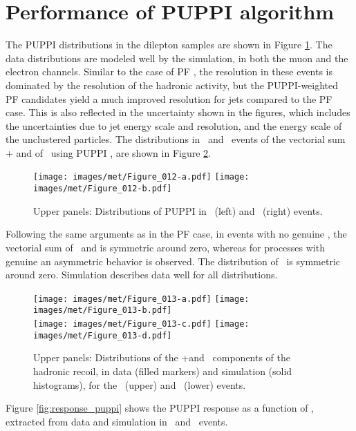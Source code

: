 \section{Performance of PUPPI \ptmiss algorithm}
\noindent\justify
The PUPPI \ptmiss distributions in the dilepton samples are shown in Figure \ref{fig:puppimet}. 
The data distributions are modeled well by the simulation, in both the muon and the electron channels. 
Similar to the case of PF \ptmiss, the \ptmiss resolution in these events is dominated by the resolution of the hadronic activity, 
but the PUPPI-weighted PF candidates yield a much improved resolution for jets compared to the PF case. 
This is also reflected in the uncertainty shown in the figures, which includes the uncertainties due to jet energy scale and resolution, and the energy scale of the unclustered particles. 
The distributions in \Zmm\ and \Zee\ events of the vectorial sum \upar + \qt and of \uperp\, using PUPPI \ptmiss, are shown in Figure \ref{fig:uparuperp_puppi}. 
\begin{figure}[htbp!]
  \centering
  \texttt{[image: images/met/Figure\_012-a.pdf]}
  \texttt{[image: images/met/Figure\_012-b.pdf]}
  \caption{Upper panels: Distributions of PUPPI \ptmiss in \Zmm\ (left) and \Zee\ (right) events.}
  \label{fig:puppimet}
\end{figure}
\newpara
\noindent\justify
Following the same arguments as in the PF \ptmiss case, in events with no genuine \ptmiss, the vectorial sum of \upar\ and \qt is symmetric around zero, whereas for processes with genuine \ptmiss an asymmetric behavior is observed. 
The distribution of \uperp\ is symmetric around zero. Simulation describes data well for all distributions.
\begin{figure}[htbp!]
  \centering
  \texttt{[image: images/met/Figure\_013-a.pdf]}
  \texttt{[image: images/met/Figure\_013-b.pdf]}\\
  \texttt{[image: images/met/Figure\_013-c.pdf]}
  \texttt{[image: images/met/Figure\_013-d.pdf]}
  \caption{Upper panels: Distributions of the \upar+\qt and \uperp\ components of the hadronic recoil, in data (filled markers) and simulation (solid histograms), for the \Zmm\ (upper) and \Zee\ (lower) events.} 
  \label{fig:uparuperp_puppi}
\end{figure}
Figure \ref{fig:response_puppi} shows the PUPPI \ptmiss response as a function of \qt, extracted from data and simulation in \Zmm\ and \Zee\ events. 

